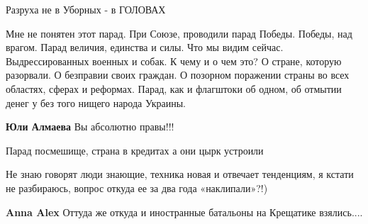 \begin{itemize}
Разруха не в Уборных - в ГОЛОВАХ


\obeycr
Мне не понятен этот парад.
При Союзе, проводили парад Победы. Победы, над врагом. Парад величия, единства и силы.
Что мы видим сейчас. Выдрессированных военных и собак.
К чему и о чем это?
О стране, которую разорвали. О безправии своих граждан. О позорном поражении страны во всех областях, сферах и реформах.
Парад, как и флагштоки об одном, об отмытии денег у без того нищего народа Украины.
\restorecr

\begin{itemize}
 
\textbf{Юли Алмаева} Вы абсолютно правы!!!
\end{itemize}

 
Парад посмешище, страна в кредитах а они цырк устроили

 

Не знаю говорят люди знающие, техника новая и отвечает тенденциям, я кстати не
разбираюсь, вопрос откуда ее за два года «наклипали»?!)

\begin{itemize}
 
\textbf{Anna Alex} Оттуда же откуда и иностранные батальоны на Крещатике взялись....

 

\end{itemize}
\end{itemize}
